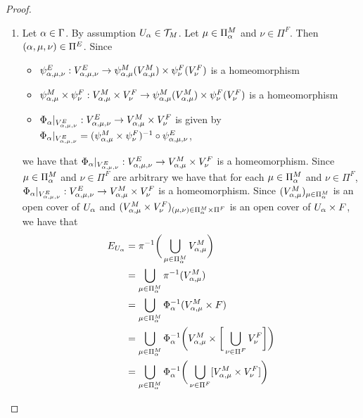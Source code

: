 \documentclass{book}
\begin{document}
\begin{proof}
\begin{enumerate}
\begin{itemize}
			\end{itemize}
			The topological manifold chart lemma () implies that there exists a unique topology $\MT_E$ on $E$ such that $(E, \MT_E) \in \Obj(\bManz)$, $\dim E = n+k$ and $(V^E_{\al, \mu, \nu}, \psi^E_{\al, \mu, \nu})_{(\al, \mu, \nu) \in \Pi^E} \subset X^{n+k}(E, \MT_E)$.
			\item Let $\alpha \in \Gamma$. By assumption $U_{\alpha} \in \mathcal{T}_M$. Let $\mu \in \Pi^M_{\alpha}$ and $\nu \in \Pi^F$. Then $(\alpha, \mu, \nu) \in \Pi^E$. Since 
			\begin{itemize}
				\item $\psi^E_{\alpha, \mu, \nu}: V^E_{\alpha, \mu, \nu} \rightarrow \psi^M_{\alpha, \mu}(V^M_{\alpha, \mu}) \times \psi^F_{\nu}(V^F_{\nu})$ is a homeomorphism
				\item $\psi^M_{\alpha, \mu} \times \psi^F_{\nu}: V^M_{\alpha, \mu} \times V^F_{\nu} \rightarrow \psi^M_{\alpha, \mu}(V^M_{\alpha, \mu}) \times \psi^F_{\nu}(V^F_{\nu})$ is a homeomorphism  
				\item $\Phi_{\alpha}|_{V^E_{\alpha, \mu, \nu}}: V^E_{\alpha, \mu, \nu} \rightarrow V^M_{\alpha, \mu} \times V^F_{\nu}$ is given by 
				$\Phi_{\alpha}|_{V^E_{\alpha, \mu, \nu}} =  (\psi^M_{\alpha, \mu} \times \psi^F_{\nu})^{-1} \circ \psi^E_{\alpha, \mu, \nu}$,
			\end{itemize}
			we have that $\Phi_{\alpha}|_{V^E_{\alpha, \mu, \nu}}: V^E_{\alpha, \mu, \nu} \rightarrow V^M_{\alpha, \mu} \times V^F_{\nu}$ is a homeomorphism. Since $\mu \in \Pi^M_{\alpha}$ and $\nu \in \Pi^F$ are arbitrary we have that for each $\mu \in \Pi^M_{\alpha}$ and $\nu \in \Pi^F$, $\Phi_{\alpha}|_{V^E_{\alpha, \mu, \nu}}: V^E_{\alpha, \mu, \nu} \rightarrow V^M_{\alpha, \mu} \times V^F_{\nu}$ is a homeomorphism. Since $(V^M_{\alpha, \mu})_{\mu \in \Pi^M_{\alpha}}$ is an open cover of $U_{\alpha}$ and $(V^M_{\alpha, \mu}\times V^F_{\nu})_{(\mu, \nu) \in \Pi^M_{\alpha} \times \Pi^F}$ is an open cover of $U_{\alpha} \times F$, we have that 
			\begin{align*}
				E_{U_{\al}}
				& = \pi^{-1}\bigg( \bigcup_{\mu \in \Pi^M_{\al}} V^M_{\al, \mu} \bigg) \\
				& = \bigcup_{\mu \in \Pi^M_{\al}} \pi^{-1}(V^M_{\al, \mu}) \\
				& = \bigcup_{\mu \in \Pi^M_{\al}} \Phi_{\al}^{-1}(V^M_{\al, \mu} \times F) \\
				& = \bigcup_{\mu \in \Pi^M_{\al}} \Phi_{\al}^{-1} \bigg( V^M_{\al, \mu} \times \bigg[ \bigcup_{\nu \in \Pi^F} V^F_{\nu} \bigg] \bigg) \\
				& = \bigcup_{\mu \in \Pi^M_{\al}} \Phi_{\al}^{-1} \bigg(  \bigcup_{\nu \in \Pi^F} [V^M_{\al, \mu} \times V^F_{\nu} ] \bigg) \\

\end{align*}
\end{enumerate}
\end{proof}
\end{document}

